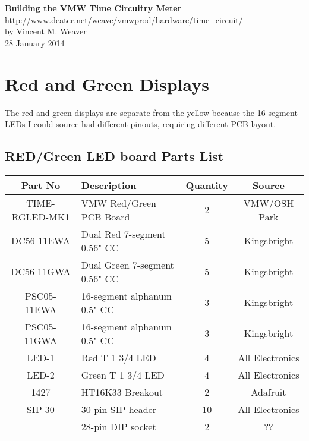 \documentclass[11pt]{article}
\begin{document}
\begin{center}
{\Large \bf Building the VMW Time Circuitry Meter}\\
\url{http://www.deater.net/weave/vmwprod/hardware/time_circuit/}\\
by Vincent M. Weaver\\
28 January 2014
\end{center}

\section{Red and Green Displays}

The red and green displays are separate from the yellow because
the 16-segment LEDs I could source had different pinouts, requiring
different PCB layout.

\subsection{RED/Green LED board Parts List}

\begin{tabular}{|c|l|c|c|}
\hline
Part No   &  Description    &  Quantity    &   Source \\
\hline
\hline
TIME-RGLED-MK1 & VMW Red/Green PCB Board       & 2 & VMW/OSH Park\\ %
\hline
DC56-11EWA     & Dual Red 7-segment 0.56" CC   & 5 & Kingsbright\\ %
\hline
DC56-11GWA     & Dual Green 7-segment 0.56" CC & 5 & Kingsbright\\ %
\hline
PSC05-11EWA    & 16-segment alphanum 0.5" CC   & 3 & Kingsbright\\ %
\hline
PSC05-11GWA    & 16-segment alphanum 0.5" CC   & 3 & Kingsbright\\ %
\hline
LED-1          & Red T 1 3/4 LED               & 4 & All Electronics\\ %
\hline
LED-2          & Green T 1 3/4 LED             & 4 & All Electronics\\ %
\hline
1427           & HT16K33 Breakout              & 2 & Adafruit\\ %
\hline
SIP-30	       & 30-pin SIP header             & 10 & All Electronics\\ %
\hline
               & 28-pin DIP socket             & 2 & ?? \\ %
\hline
\end{tabular}

\end{document}
